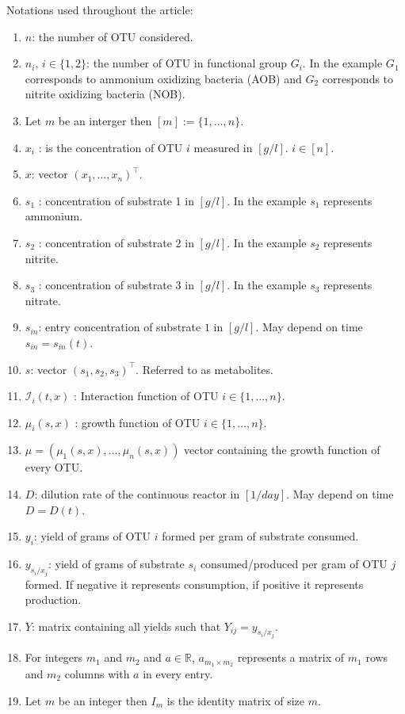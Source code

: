 \documentclass[processes,article,submit,moreauthors,pdftex]{Definitions/mdpi}
\newcommand{\R}{\mathbb{R}}
\newcommand{\I}{\mathcal{I}}
\begin{document}
Notations used throughout the article:
\begin{enumerate}
	\item $n$: the number of OTU considered.
	\item $n_i, \, i \in \{1,2\}$: the number of OTU in functional group $G_i$. In the example $G_1$ corresponds to ammonium oxidizing bacteria (AOB) and $G_2$ corresponds to nitrite oxidizing bacteria (NOB).
	\item Let $m$ be an interger then $[m]:=\{1,\dots,n \}$. 
	\item $x_i$ :  is the concentration of OTU $i$ measured in $[g/l]$. $i \in [n]$. 
	\item $x$: vector $(x_1,\dots,x_n)^\top$.
	\item $s_1$ : concentration of substrate 1 in $[g/l]$. In the example $s_1$ represents ammonium.
	\item $s_2$ : concentration of substrate 2 in $[g/l]$. In the example $s_2$ represents nitrite. 
	\item $s_3$ : concentration of substrate 3 in $[g/l]$. In the example $s_3$ represents nitrate.
	\item $s_{in}$: entry concentration of substrate $1$ in $[g/l]$. May depend on time $s_{in} = s_{in}(t)$.
	\item $s$:  vector $(s_1,s_2,s_3)^\top$. Referred to as metabolites.
	\item $\I_i(t,x)$ : Interaction function of OTU $i \in \{1,\dots,n\}$.
	\item $\mu_i(s,x)$ : growth function of OTU $i \in \{1,\dots,n\}$.
	\item $\mu = (\mu_1(s,x), \dots, \mu_n(s,x))$ vector containing the growth function of every OTU.
	\item $D$: dilution rate of the continuous reactor in $[1/day]$. May depend on time $D=D(t)$.
	\item $y_{i}$: yield of grams of OTU $i$ formed per gram of substrate consumed. 
	\item $y_{s_i/x_j}$: yield of grams of substrate $s_i$ consumed/produced per gram of OTU $j$ formed. If negative it represents consumption, if positive it represents production.
	\item $Y$: matrix containing all yields such that $Y_{ij} = y_{s_i/x_j}$.
	\item For integers $m_1$ and $m_2$ and $a \in \R$, $a_{m_1 \times m_2}$ represents a matrix of $m_1$ rows and $m_2$ columns with $a$ in every entry. 
	\item Let $m$ be an integer then $I_m$ is the identity matrix of size $m$.

\end{enumerate}
\end{document}
